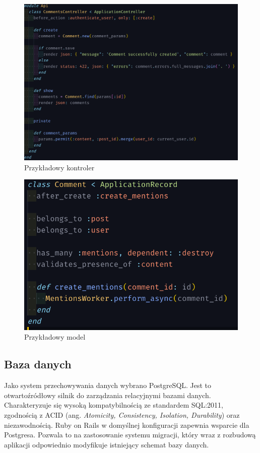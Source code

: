 \documentclass[declaration,shortabstract]{iithesis}
\begin{document}
\begin{figure}
    \centering
    \includegraphics[width=\textwidth]{images/kontroler.png}
    \caption{Przykładowy kontroler}
    \label{fig:kontroler}
\end{figure}
\begin{figure}
    \centering
    \includegraphics[width=\textwidth]{images/comment_model.png}
    \caption{Przykładowy model}
    \label{fig:model}
\end{figure}


\subsection{Baza danych}
Jako system przechowywania danych wybrano PostgreSQL. Jest to otwartoźródłowy silnik do zarządzania relacyjnymi bazami danych. Charakteryzuje się wysoką kompatybilnością ze standardem SQL:2011, zgodnością z ACID (ang. \textit{Atomicity, Consistency, Isolation, Durability}) oraz niezawodnością. Ruby on Rails w domyślnej konfiguracji zapewnia wsparcie dla Postgresa. Pozwala to na zastosowanie systemu migracji, który wraz z rozbudową aplikacji odpowiednio modyfikuje istniejący schemat bazy danych.
\end{document}
